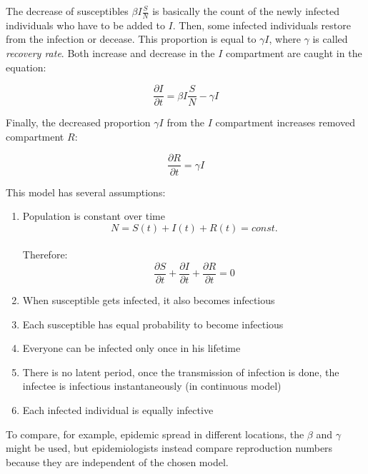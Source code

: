 \documentclass[
  digital, %
  oneside, %
  lof,     %
  lot,     %
]{fithesis4}
\begin{document}
The decrease of susceptibles $\beta I \frac{S}{N}$ is basically the count of the newly infected individuals who have to be added to $I$.
Then, some infected individuals restore from the infection or decease. 
This proportion is equal to $\gamma I$, where $\gamma$ is called \textit{recovery rate}. Both increase and decrease in the $I$ compartment are caught in the equation:

\begin{equation}\label{eq:sir-model-partial-I}
	\frac{\partial{I}}{\partial{t}} = \beta I \frac{S}{N} - \gamma I
\end{equation}

Finally, the decreased proportion $\gamma I$ from the $I$ compartment increases removed compartment $R$:

\begin{equation}
	\frac{\partial{R}}{\partial{t}} = \gamma I
\end{equation}

This model has several assumptions:

\begin{enumerate}
  \item Population is constant over time \\
    \begin{equation}
      N = S(t) + I(t) + R(t) = const.
    \end{equation} \\
    Therefore: \\
    \begin{equation}
      \frac{\partial{S}}{\partial{t}} + \frac{\partial{I}}{\partial{t}} + \frac{\partial{R}}{\partial{t}} = 0
    \end{equation}
  \item When susceptible gets infected, it also becomes infectious
  \item Each susceptible has equal probability to become infectious
  \item Everyone can be infected only once in his lifetime
  \item There is no latent period, once the transmission of infection is done, the infectee is infectious instantaneously (in continuous model)
  \item Each infected individual is equally infective \cite{volz2018}
\end{enumerate}

To compare, for example, epidemic spread in different locations, the $\beta$ and $\gamma$ might be used, but epidemiologists instead compare reproduction numbers because they are independent of the chosen model.
\end{document}
